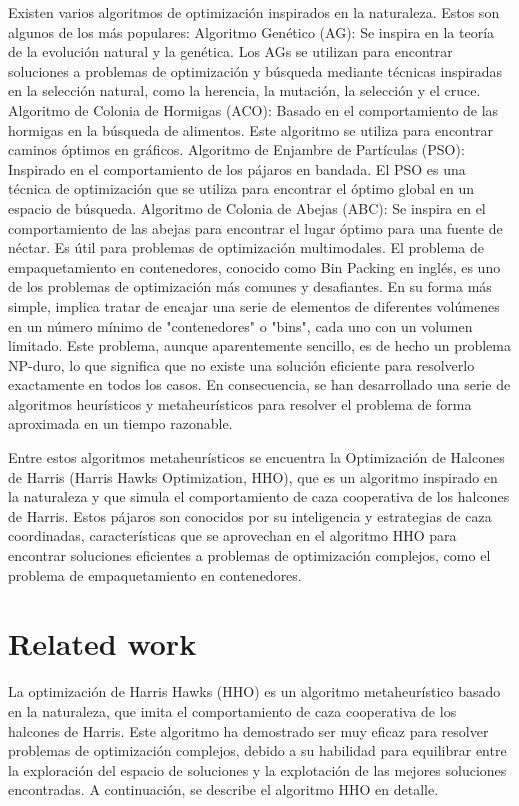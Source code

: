 \documentclass[final,5p,times,twocolumn]{elsarticle}
\begin{document}
Existen varios algoritmos de optimización inspirados en la naturaleza. Estos son algunos de los más populares:
Algoritmo Genético (AG): Se inspira en la teoría de la evolución natural y la genética. Los AGs se utilizan para encontrar soluciones a problemas de optimización y búsqueda mediante técnicas inspiradas en la selección natural, como la herencia, la mutación, la selección y el cruce.
Algoritmo de Colonia de Hormigas (ACO): Basado en el comportamiento de las hormigas en la búsqueda de alimentos. Este algoritmo se utiliza para encontrar caminos óptimos en gráficos.
Algoritmo de Enjambre de Partículas (PSO): Inspirado en el comportamiento de los pájaros en bandada. El PSO es una técnica de optimización que se utiliza para encontrar el óptimo global en un espacio de búsqueda.
Algoritmo de Colonia de Abejas (ABC): Se inspira en el comportamiento de las abejas para encontrar el lugar óptimo para una fuente de néctar. Es útil para problemas de optimización multimodales.
El problema de empaquetamiento en contenedores, conocido como Bin Packing en inglés, es uno de los problemas de optimización más comunes y desafiantes. En su forma más simple, implica tratar de encajar una serie de elementos de diferentes volúmenes en un número mínimo de "contenedores" o "bins", cada uno con un volumen limitado.
Este problema, aunque aparentemente sencillo, es de hecho un problema NP-duro, lo que significa que no existe una solución eficiente para resolverlo exactamente en todos los casos. En consecuencia, se han desarrollado una serie de algoritmos heurísticos y metaheurísticos para resolver el problema de forma aproximada en un tiempo razonable.

Entre estos algoritmos metaheurísticos se encuentra la Optimización de Halcones de Harris (Harris Hawks Optimization, HHO), que es un algoritmo inspirado en la naturaleza y que simula el comportamiento de caza cooperativa de los halcones de Harris. Estos pájaros son conocidos por su inteligencia y estrategias de caza coordinadas, características que se aprovechan en el algoritmo HHO para encontrar soluciones eficientes a problemas de optimización complejos, como el problema de empaquetamiento en contenedores.
\section{Related work}
\label{sec:rw}
La optimización de Harris Hawks (HHO) es un algoritmo metaheurístico basado en la naturaleza, que imita el comportamiento de caza cooperativa de los halcones de Harris. Este algoritmo ha demostrado ser muy eficaz para resolver problemas de optimización complejos, debido a su habilidad para equilibrar entre la exploración del espacio de soluciones y la explotación de las mejores soluciones encontradas. A continuación, se describe el algoritmo HHO en detalle.
\end{document}
